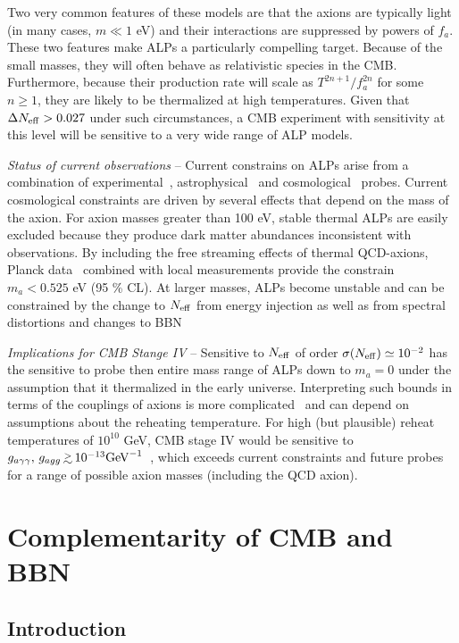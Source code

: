 Two very common features of these models are that the axions are typically light (in many cases, $m \ll 1$ eV) and their interactions are suppressed by powers of $f_a$.  These two features make ALPs a particularly compelling target.  Because of the small masses, they will often behave as relativistic species in the CMB.  Furthermore, because their production rate will scale as $T^{2n +1} / f_a^{2n}$ for some $n \geq 1$, they are likely to be thermalized at high temperatures.  Given that $\Delta N_{\rm eff} > 0.027$ under such circumstances, a CMB experiment with sensitivity at this level will be sensitive to a very wide range of ALP models.

{\it Status of current observations} -- Current constrains on ALPs arise from a combination of experimental~\cite{Graham:2015ouw}, astrophysical~\cite{Raffelt:2012kt} and cosmological~\cite{Marsh:2015xka} probes.  Current cosmological constraints are driven by several effects that depend on the mass of the axion.  For axion masses greater than 100 eV, stable thermal ALPs are easily excluded because they produce dark matter abundances inconsistent with observations.  By including the free streaming effects of thermal QCD-axions,  Planck data~\cite{DiValentino:2015wba} combined with local measurements provide the constrain $m_a < 0.525$ eV (95 \% CL).  At larger masses, ALPs become unstable and can be constrained by the change to $N_{\rm eff}$ from energy injection as well as from spectral distortions and changes to BBN~\cite{Cadamuro:2011fd,Follin:2015hya}

{\it Implications for CMB Stange IV} -- Sensitive to $N_{\rm eff}$ of order $\sigma(N_{\rm eff}) \simeq 10^{-2}$ has the sensitive to probe then entire mass range of ALPs down to $m_a =0$ under the assumption that it thermalized in the early universe.  Interpreting such bounds in terms of the couplings of axions is more complicated~\cite{Brust:2013xpv} and can depend on assumptions about the reheating temperature.  For high (but plausible) reheat temperatures of $10^{10}$ GeV, CMB stage IV would be sensitive to $g_{a\gamma \gamma}, \, g_{a g g} \,  \gtrsim \, 10^{-13} {\rm GeV}^{-1}$~\cite{}, which exceeds current constraints and future probes for a range of possible axion masses (including the QCD axion).  

\section{Complementarity of CMB and BBN}

\subsection{Introduction} \label{Introduction}

